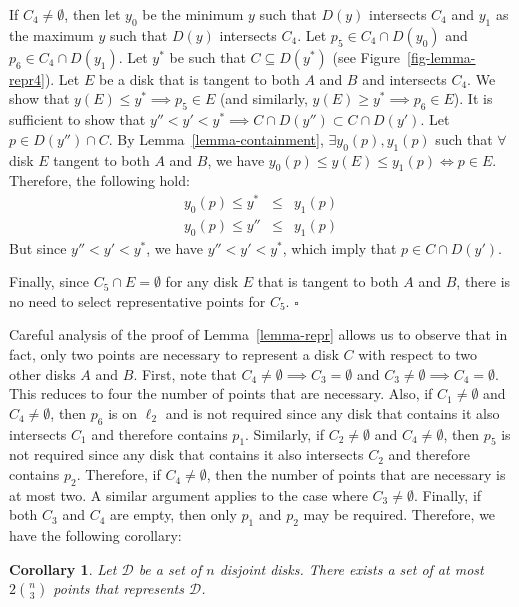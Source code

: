 \documentclass[pdftex,leqno,fleqn,12pt]{article}
\newtheorem{corollary}[theorem]{Corollary}
\newenvironment{proof}{{\textit Proof:} \rm}{\hfill $\square$ \medskip\\}
\begin{document}
\begin{proof}
If $C_4\neq\emptyset$, then let $y_0$ be the minimum $y$ such that $D(y)$ intersects $C_4$ and
$y_1$ as the maximum $y$ such that $D(y)$ intersects $C_4$. Let $p_5\in C_4\cap D(y_0)$ and $p_6\in
C_4\cap D(y_1)$. Let $y^*$ be such that $C\subseteq D(y^*)$ (see Figure~\ref{fig-lemma-repr4}).
Let $E$ be a disk that is tangent to both $A$ and
$B$ and intersects $C_4$. We show that $y(E)\leq y^*\implies p_5\in E$ (and similarly, $y(E)\geq
y^*\implies p_6\in E$). It is sufficient to show that $y''<y'<y^*\implies C\cap D(y'')\subset C\cap
D(y')$. Let $p\in D(y'')\cap C$. By Lemma~\ref{lemma-containment}, $\exists y_0(p),y_1(p)$ such
that $\forall$ disk $E$ tangent to both $A$ and $B$, we have $y_0(p)\leq y(E)\leq y_1(p)\Leftrightarrow
p\in E$. Therefore, the following hold:
\begin{eqnarray*}
y_0(p)\leq y^* &\leq & y_1(p)\\
y_0(p)\leq y'' &\leq & y_1(p)
\end{eqnarray*}
But since $y''<y'<y^*$, we have $y''<y'<y^*$, which imply that $p\in
 C\cap D(y')$.

Finally, since $C_5\cap E=\emptyset$ for any disk $E$ that is tangent to both $A$ and $B$, there is no
need to select representative points for $C_5$.
\end{proof}

Careful analysis of the proof of Lemma~\ref{lemma-repr} allows us to observe that in fact, only two
points are necessary to represent a disk $C$ with respect to two other disks $A$ and $B$. First,
note that $C_4\neq\emptyset\implies C_3=\emptyset$ and $C_3\neq\emptyset\implies C_4=\emptyset$.
This reduces to four the number of points that are necessary. Also, if $C_1\neq\emptyset$ and
$C_4\neq\emptyset$, then $p_6$ is on $\ell_2$ and is not required since any disk that contains it
also intersects $C_1$ and therefore contains $p_1$. Similarly, if $C_2\neq\emptyset$ and
$C_4\neq\emptyset$, then $p_5$ is not required since any disk that contains it also intersects
$C_2$ and therefore contains $p_2$. Therefore, if $C_4\neq\emptyset$, then the number of points
that are necessary is at most two. A similar argument applies to the case where $C_3\neq\emptyset$.
Finally, if both $C_3$ and $C_4$ are empty, then only $p_1$ and $p_2$ may be required. Therefore,
we have the following corollary:

\begin{corollary}\label{cor-finite-rep} Let $\mathcal{D}$ be a set of $n$ disjoint disks.
There exists a set of at most $2\binom{n}{3}$ points that represents $\mathcal{D}$.
\end{corollary}
\end{document}

